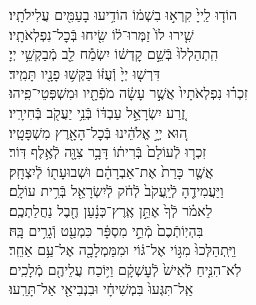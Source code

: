 \documentclass[twoside, openany, parskip=half, 11pt]{book}
\begin{document}
\begin{narrow}
הוֹד֤וּ לַֽייָ֙ קִרְא֣וּ בִשְׁמ֔וֹ \hfill
הוֹדִ֥יעוּ בָעַמִּ֖ים עֲלִילֹתָֽיו׃ \\
שִׁ֤ירוּ לוֹ֙ זַמְּרוּ־ל֔וֹ \hfill שִׂ֖יחוּ בְּֿכׇל־נִפְלְאֹתָֽיו׃ \\
הִֽתְהַלְלוּ֙ בְּֿשֵׁ֣ם קׇדְשׁ֔וֹ \hfill יִשְׂמַ֕ח לֵ֖ב מְֿבַקְשֵׁ֥י יְיָ׃ \\
דִּרְשׁ֤וּ יְיָ֙ וְֿעֻזּ֔וֹ \hfill בַּקְּשׁ֥וּ פָנָ֖יו תָּמִֽיד׃ \\
זִכְר֗וּ נִפְלְאֹתָיו֙ אֲשֶׁ֣ר עָשָׂ֔ה \hfill מֹפְֿתָ֖יו וּמִשְׁפְּטֵי־פִֽיהוּ׃ \\
זֶ֚רַע יִשְׂרָאֵ֣ל עַבְדּ֔וֹ \hfill בְּֿנֵ֥י יַעֲקֹ֖ב בְּֿחִירָֽיו׃ \\
ה֚וּא יְיָ֣ אֱלֹהֵ֔ינוּ \hfill בְּֿכׇל־הָאָ֖רֶץ מִשְׁפָּטָֽיו׃ \\
זִכְר֤וּ לְֿעוֹלָם֙ בְּֿרִית֔וֹ \hfill דָּבָ֥ר צִוָּ֖ה לְֿאֶ֥לֶף דּֽוֹר׃ \\
אֲשֶׁ֤ר כָּרַת֙ אֶת־אַבְרָהָ֔ם \hfill וּשְׁבוּעָת֖וֹ לְֿיִצְחָֽק׃ \\
וַיַּעֲמִידֶ֤הָ לְֿיַֽעֲקֹב֙ לְֿחֹ֔ק \hfill לְֿיִשְׂרָאֵ֖ל בְּֿרִ֥ית עוֹלָֽם׃ \\
לֵאמֹ֗ר לְֿךָ֙ אֶתֵּ֣ן אֶֽרֶץ־כְּנָ֔עַן \hfill חֶ֖בֶל נַחֲלַתְכֶֽם׃ \\
בִּהְיֽוֹתְֿכֶם֙ מְֿתֵ֣י מִסְפָּ֔ר \hfill כִּמְעַ֖ט וְֿגָרִ֥ים בָּֽהּ׃ \\
וַיִּֽתְהַלְּכוּ֙ מִגּ֣וֹי אֶל־גּ֔וֹי \hfill וּמִמַּמְלָכָ֖ה אֶל־עַ֥ם אַחֵֽר׃ \\
לֹֽא־הִנִּ֤יחַ לְֿאִישׁ֙ לְֿעׇשְׁקָ֔ם \hfill וַיּ֥וֹכַח עֲלֵיהֶ֖ם מְֿלָכִֽים׃ \\
אַֽל־תִּגְּעוּ֙ בִּמְשִׁיחָ֔י \hfill וּבִנְבִיאַ֖י אַל־תָּרֵֽעוּ׃


\end{narrow}
\end{document}
